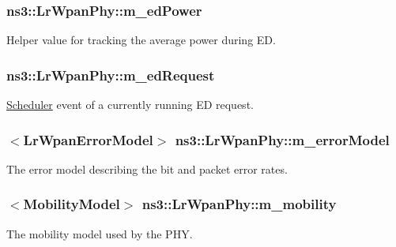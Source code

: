 \subsubsection[{\texorpdfstring{m\+\_\+ed\+Power}{m_edPower}}]{ ns3\+::\+Lr\+Wpan\+Phy\+::m\+\_\+ed\+Power\hspace{0.3cm}{\ttfamily [private]}}\hypertarget{classns3_1_1LrWpanPhy_a63a7ca8192b16aa1d4ea320c1a43452f}{}\label{classns3_1_1LrWpanPhy_a63a7ca8192b16aa1d4ea320c1a43452f}
Helper value for tracking the average power during ED. 
\subsubsection[{\texorpdfstring{m\+\_\+ed\+Request}{m_edRequest}}]{ ns3\+::\+Lr\+Wpan\+Phy\+::m\+\_\+ed\+Request\hspace{0.3cm}{\ttfamily [private]}}\hypertarget{classns3_1_1LrWpanPhy_a7de5c9c2ff7a6797ef475fb030e99ad0}{}\label{classns3_1_1LrWpanPhy_a7de5c9c2ff7a6797ef475fb030e99ad0}
\hyperlink{classns3_1_1Scheduler}{Scheduler} event of a currently running ED request. 
\subsubsection[{\texorpdfstring{m\+\_\+error\+Model}{m_errorModel}}]{$<${\bf Lr\+Wpan\+Error\+Model}$>$ ns3\+::\+Lr\+Wpan\+Phy\+::m\+\_\+error\+Model\hspace{0.3cm}{\ttfamily [private]}}\hypertarget{classns3_1_1LrWpanPhy_a51ab23fe176708768b6276cdbbd68a06}{}\label{classns3_1_1LrWpanPhy_a51ab23fe176708768b6276cdbbd68a06}
The error model describing the bit and packet error rates. 
\subsubsection[{\texorpdfstring{m\+\_\+mobility}{m_mobility}}]{$<${\bf Mobility\+Model}$>$ ns3\+::\+Lr\+Wpan\+Phy\+::m\+\_\+mobility\hspace{0.3cm}{\ttfamily [private]}}\hypertarget{classns3_1_1LrWpanPhy_a746dc7299fae28fafa617075ca3b5433}{}\label{classns3_1_1LrWpanPhy_a746dc7299fae28fafa617075ca3b5433}
The mobility model used by the P\+HY. 
